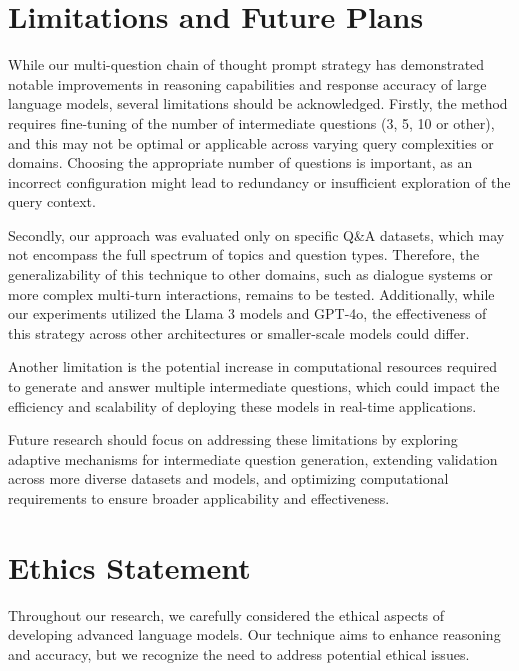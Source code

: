 \section*{Limitations and Future Plans}

While our multi-question chain of thought prompt strategy has demonstrated notable improvements in reasoning capabilities and response accuracy of large language models, several limitations should be acknowledged. Firstly, the method requires fine-tuning of the number of intermediate questions (3, 5, 10 or other), and this may not be optimal or applicable across varying query complexities or domains. Choosing the appropriate number of questions is important, as an incorrect configuration might lead to redundancy or insufficient exploration of the query context.

Secondly, our approach was evaluated only on specific Q\&A datasets, which may not encompass the full spectrum of topics and question types. Therefore, the generalizability of this technique to other domains, such as dialogue systems or more complex multi-turn interactions, remains to be tested. Additionally, while our experiments utilized the Llama 3 models and GPT-4o, the effectiveness of this strategy across other architectures or smaller-scale models could differ.

Another limitation is the potential increase in computational resources required to generate and answer multiple intermediate questions, which could impact the efficiency and scalability of deploying these models in real-time applications. 


Future research should focus on addressing these limitations by exploring adaptive mechanisms for intermediate question generation, extending validation across more diverse datasets and models, and optimizing computational requirements to ensure broader applicability and effectiveness.

\section*{Ethics Statement}

Throughout our research, we carefully considered the ethical aspects of developing advanced language models. Our technique aims to enhance reasoning and accuracy, but we recognize the need to address potential ethical issues.

